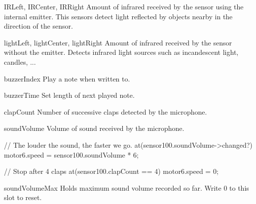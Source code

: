 \begin{urbiscriptapi}

\item[IRLeft, IRCenter, IRRight]
  Amount of infrared received by the sensor using the internal emitter. This
  sensors detect light reflected by objects nearby in the direction of the
  sensor.

\item[lightLeft, lightCenter, lightRight]
  Amount of infrared received by the sensor without the emitter. Detects
  infrared light sources such as incandescent light, candles, ...

\item[buzzerIndex]
  Play a note when written to.

\item[buzzerTime]
  Set length of next played note.

\item[clapCount]
  Number of successive claps detected by the microphone.

\item[soundVolume]
  Volume of sound received by the microphone.

\begin{urbiunchecked}
// The louder the sound, the faster we go.
at(sensor100.soundVolume->changed?)
  motor6.speed = sensor100.soundVolume * 6;

// Stop after 4 claps
at(sensor100.clapCount == 4)
  motor6.speed = 0;
\end{urbiunchecked}

\item[soundVolumeMax]
  Holds maximum sound volume recorded so far. Write 0 to this slot to reset.

\end{urbiscriptapi}





